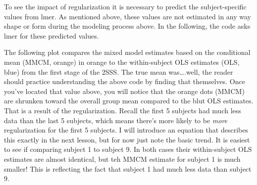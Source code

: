 \documentclass[]{book}
\newenvironment{Shaded}{\begin{snugshade}}{\end{snugshade}}
\newcommand{\KeywordTok}[1]{\textcolor[rgb]{0.13,0.29,0.53}{\textbf{{#1}}}}
\newcommand{\DecValTok}[1]{\textcolor[rgb]{0.00,0.00,0.81}{{#1}}}
\newcommand{\StringTok}[1]{\textcolor[rgb]{0.31,0.60,0.02}{{#1}}}
\newcommand{\CommentTok}[1]{\textcolor[rgb]{0.56,0.35,0.01}{\textit{{#1}}}}
\newcommand{\NormalTok}[1]{{#1}}
\begin{document}
To see the impact of regularization it is necessary to predict the
subject-specific values from lmer. As mentioned above, these values are
not estimated in any way shape or form during the modeling process
above. In the following, the code asks lmer for these predicted values.

\begin{Shaded}
\end{Shaded}

The following plot compares the mixed model estimates based on the
conditional mean (MMCM, orange) in orange to the within-subject OLS
estimates (OLS, blue) from the first stage of the 2SSS. The true mean
was\ldots{}.well, the reader should practice understanding the above
code by finding that themselves. Once you've located that value above,
you will notice that the orange dots (MMCM) are shrunken toward the
overall group mean compared to the blut OLS estimates. That is a result
of the regularization. Recall the first 5 subjects had much less data
than the last 5 subjects, which means there's more likely to be
\emph{more} regularization for the first 5 subjects. I will introduce an
equation that describes this exactly in the next lesson, but for now
just note the basic trend. It is easiest to see if comparing subject 1
to subject 9. In both cases their within-subject OLS estimates are
almost identical, but teh MMCM estimate for subject 1 is much smaller!
This is reflecting the fact that subject 1 had much less data than
subject 9.
\end{document}
